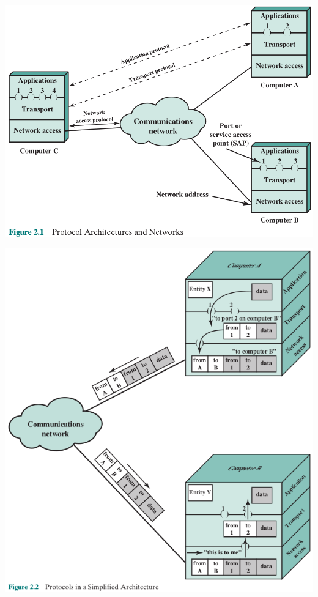 \documentclass[pdflatex,compress]{beamer}
\begin{document}
\begin{frame}
	\begin{center}
		\includegraphics[width=0.8\linewidth]{img/img01}
	\end{center}
\end{frame}

\begin{frame}
	\begin{center}
		\includegraphics[height=0.9\textheight]{img/img02}
	\end{center}
\end{frame}
\end{document}
